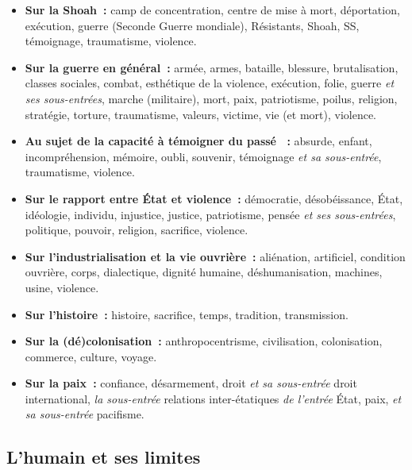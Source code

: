 \begin{itemize}\setlength{\itemsep}{6pt}

\item \textbf{Sur la Shoah~:} camp de concentration, centre de mise à mort, déportation, exécution, guerre (Seconde Guerre mondiale), Résistants, Shoah, SS, témoignage, traumatisme, violence.

\item \textbf{Sur la guerre en général~:} armée, armes, bataille, blessure, brutalisation, classes sociales, combat, esthétique de la violence, exécution, folie, guerre \textit{et ses sous-entrées}, marche (militaire), mort, paix, patriotisme, poilus, religion, stratégie, torture, traumatisme, valeurs, victime, vie (et mort), violence.

\item \textbf{Au sujet de la capacité à témoigner du passé ~:} absurde, enfant, incompréhension, mémoire, oubli, souvenir, témoignage \textit{et sa sous-entrée}, traumatisme, violence.

\item \textbf{Sur le rapport entre État et violence~:} démocratie, désobéissance, État, idéologie, individu, injustice, justice, patriotisme, pensée \textit{et ses sous-entrées}, politique, pouvoir, religion, sacrifice, violence.

\item \textbf{Sur l'industrialisation et la vie ouvrière~:} aliénation, artificiel, condition ouvrière, corps, dialectique, dignité humaine, déshumanisation, machines, usine, violence.

\item \textbf{Sur l'histoire~:} histoire, sacrifice, temps, tradition, transmission.

\item \textbf{Sur la (dé)colonisation~:} anthropocentrisme, civilisation, colonisation, commerce, culture, voyage.

\item \textbf{Sur la paix~:} confiance, désarmement, droit \textit{et sa sous-entrée} droit international, \textit{la sous-entrée} relations inter-étatiques \textit{de l'entrée} État, paix, \textit{et sa sous-entrée} pacifisme.

\end{itemize}


\subsection{L'humain et ses limites}

